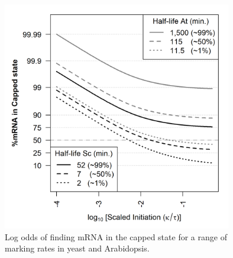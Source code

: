 \documentclass[review]{elsarticle}
\begin{document}
\begin{figure}[!ht]
\centering
\includegraphics[width=100mm]{Images/2023-07-13_logodds.png}
\caption{Log odds of finding mRNA in the capped state for a range of marking rates in yeast and Arabidopsis. }
\end{figure}
\clearpage
\end{document}
